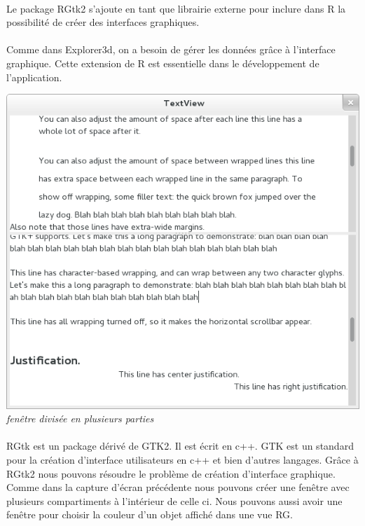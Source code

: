 \paragraph{}
Le package RGtk2 s'ajoute en tant que librairie externe pour inclure dans R la possibilité de créer des interfaces graphiques. 

\paragraph{}
Comme dans Explorer3d, on a besoin de gérer les données grâce à l'interface graphique. Cette extension de R est essentielle dans le développement de l'application. 

 \begin{center}
\includegraphics[scale=0.4]{multipleviews.png}\\
\textit{fenêtre divisée en plusieurs parties}
\end{center}

\paragraph{}
RGtk est un package dérivé de GTK2. Il est écrit en c++. GTK est un standard pour la création d'interface utilisateurs en c++ et bien d'autres langages. Grâce à RGtk2 nous pouvons résoudre le problème de création d'interface graphique. Comme dans la capture d’écran précédente nous pouvons créer une fenêtre avec plusieurs compartiments à l’intérieur de celle ci. Nous pouvons aussi avoir une fenêtre pour choisir la couleur d’un objet affiché dans une vue RG.

